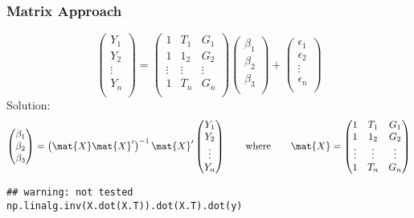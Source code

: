 \documentclass[mathserif, xcolor=table, svgnames]{beamer}
\begin{document}
\begin{frame}[fragile]
  \frametitle{Matrix Approach}
    \begin{equation*}
      \begin{pmatrix}
        Y_{1}\\
        Y_{2}\\
        \vdots\\
        Y_{n}\\
      \end{pmatrix}
      =
      \begin{pmatrix}
        1 & T_{1} & G_{1}\\
        1 & 1_{2} & G_{2}\\
        \vdots & \vdots & \vdots\\
        1 & T_{n} & G_{n}\\
      \end{pmatrix}
      \begin{pmatrix}
        \beta_{1}\\
        \beta_{2}\\
        \beta_{3}\\
      \end{pmatrix}
      +
      \begin{pmatrix}
        \epsilon_{1}\\
        \epsilon_{2}\\
        \vdots\\
        \epsilon_{n}\\
      \end{pmatrix}
    \end{equation*}
    Solution:
    \begin{equation*}
      \begin{pmatrix}
        \beta_{1}\\
        \beta_{2}\\
        \beta_{3}\\
      \end{pmatrix}
      =
      \left(
        \mat{X} \mat{X}'
      \right)^{-1}
      \mat{X}'
    \begin{pmatrix}
      Y_{1}\\
      Y_{2}\\
      \vdots\\
      Y_{n}\\
    \end{pmatrix}
    \qquad
    \text{where}
    \qquad
      \mat{X} = 
      \begin{pmatrix}
        1 & T_{1} & G_{1}\\
        1 & 1_{2} & G_{2}\\
        \vdots & \vdots & \vdots\\
        1 & T_{n} & G_{n}\\
      \end{pmatrix}
    \end{equation*}
\begin{lstlisting}[frame=trBL]
## warning: not tested
np.linalg.inv(X.dot(X.T)).dot(X.T).dot(y)
\end{lstlisting}
\end{frame}
\end{document}
